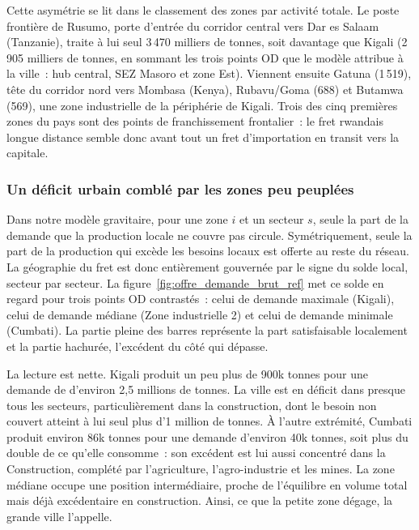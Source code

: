 \documentclass[12pt,a4paper,french]{report}
\begin{document}
	Cette asymétrie se lit dans le classement des zones par activité totale. Le poste frontière de Rusumo, porte d'entrée du corridor central vers Dar es Salaam (Tanzanie), traite à lui seul 3\,470 milliers de tonnes, soit davantage que Kigali (2\,905 milliers de tonnes, en sommant les trois points OD que le modèle attribue à la ville~: hub central, SEZ Masoro et zone Est). Viennent ensuite Gatuna (1\,519), tête du corridor nord vers Mombasa (Kenya), Rubavu/Goma (688) et Butamwa (569), une zone industrielle de la périphérie de Kigali. Trois des cinq premières zones du pays sont des points de franchissement frontalier~: le fret rwandais longue distance semble donc avant tout un fret d'importation en transit vers la capitale.

	\subsubsection{Un déficit urbain comblé par les zones peu peuplées}
	\label{subsubsec:desequilibre_taille}

	Dans notre modèle gravitaire, pour une zone $i$ et un secteur $s$, seule la part de la demande que la production locale ne couvre pas circule. Symétriquement, seule la part de la production qui excède les besoins locaux est offerte au reste du réseau. La géographie du fret est donc entièrement gouvernée par le signe du solde local, secteur par secteur. La figure~\ref{fig:offre_demande_brut_ref} met ce solde en regard pour trois points OD contrastés~: celui de demande maximale (Kigali), celui de demande médiane (Zone industrielle 2) et celui de demande minimale (Cumbati). La partie pleine des barres représente la part satisfaisable localement et la partie hachurée, l'excédent du côté qui dépasse.

	La lecture est nette. Kigali produit un peu plus de 900k tonnes pour une demande de d'environ 2,5 millions de tonnes. La ville est en déficit dans presque tous les secteurs, particulièrement dans la construction, dont le besoin non couvert atteint à lui seul plus d'1 million de tonnes. À l'autre extrémité, Cumbati produit environ 86k tonnes pour une demande d'environ 40k tonnes, soit plus du double de ce qu'elle consomme~: son excédent est lui aussi concentré dans la Construction, complété par l'agriculture, l'agro-industrie et les mines. La zone médiane occupe une position intermédiaire, proche de l'équilibre en volume total mais déjà excédentaire en construction. Ainsi, ce que la petite zone dégage, la grande ville l'appelle.
\end{document}

